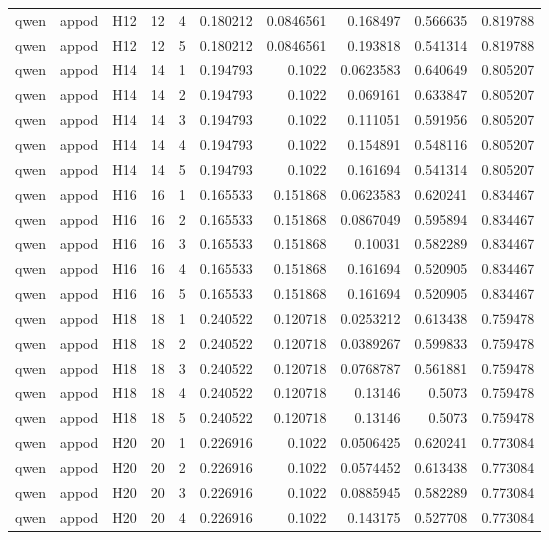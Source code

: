 \begin{longtable}{lllrrrrrrr}
qwen & appod & H12 & 12 & 4 & 0.180212 & 0.0846561 & 0.168497 & 0.566635 & 0.819788 \\
qwen & appod & H12 & 12 & 5 & 0.180212 & 0.0846561 & 0.193818 & 0.541314 & 0.819788 \\
qwen & appod & H14 & 14 & 1 & 0.194793 & 0.1022 & 0.0623583 & 0.640649 & 0.805207 \\
qwen & appod & H14 & 14 & 2 & 0.194793 & 0.1022 & 0.069161 & 0.633847 & 0.805207 \\
qwen & appod & H14 & 14 & 3 & 0.194793 & 0.1022 & 0.111051 & 0.591956 & 0.805207 \\
qwen & appod & H14 & 14 & 4 & 0.194793 & 0.1022 & 0.154891 & 0.548116 & 0.805207 \\
qwen & appod & H14 & 14 & 5 & 0.194793 & 0.1022 & 0.161694 & 0.541314 & 0.805207 \\
qwen & appod & H16 & 16 & 1 & 0.165533 & 0.151868 & 0.0623583 & 0.620241 & 0.834467 \\
qwen & appod & H16 & 16 & 2 & 0.165533 & 0.151868 & 0.0867049 & 0.595894 & 0.834467 \\
qwen & appod & H16 & 16 & 3 & 0.165533 & 0.151868 & 0.10031 & 0.582289 & 0.834467 \\
qwen & appod & H16 & 16 & 4 & 0.165533 & 0.151868 & 0.161694 & 0.520905 & 0.834467 \\
qwen & appod & H16 & 16 & 5 & 0.165533 & 0.151868 & 0.161694 & 0.520905 & 0.834467 \\
qwen & appod & H18 & 18 & 1 & 0.240522 & 0.120718 & 0.0253212 & 0.613438 & 0.759478 \\
qwen & appod & H18 & 18 & 2 & 0.240522 & 0.120718 & 0.0389267 & 0.599833 & 0.759478 \\
qwen & appod & H18 & 18 & 3 & 0.240522 & 0.120718 & 0.0768787 & 0.561881 & 0.759478 \\
qwen & appod & H18 & 18 & 4 & 0.240522 & 0.120718 & 0.13146 & 0.5073 & 0.759478 \\
qwen & appod & H18 & 18 & 5 & 0.240522 & 0.120718 & 0.13146 & 0.5073 & 0.759478 \\
qwen & appod & H20 & 20 & 1 & 0.226916 & 0.1022 & 0.0506425 & 0.620241 & 0.773084 \\
qwen & appod & H20 & 20 & 2 & 0.226916 & 0.1022 & 0.0574452 & 0.613438 & 0.773084 \\
qwen & appod & H20 & 20 & 3 & 0.226916 & 0.1022 & 0.0885945 & 0.582289 & 0.773084 \\
qwen & appod & H20 & 20 & 4 & 0.226916 & 0.1022 & 0.143175 & 0.527708 & 0.773084 \\

\end{longtable}
